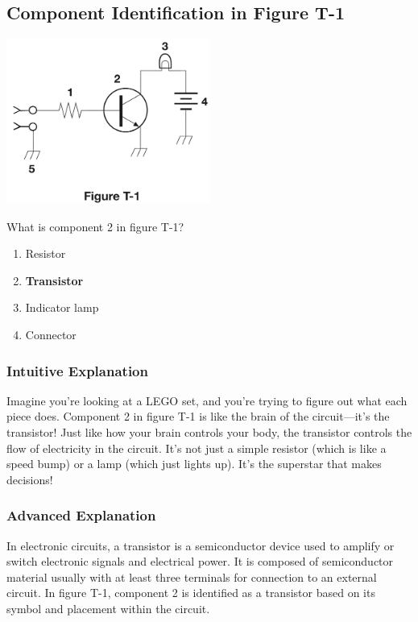 \subsection{Component Identification in Figure T-1}
\label{T6C03}

\begin{tcolorbox}[colback=gray!10!white,colframe=black!75!black,title=T6C03]
    \includegraphics[width=0.5\textwidth]{tech/images/t1.png} 



    What is component 2 in figure T-1?
\begin{enumerate}[label=\Alph*)]
    \item Resistor
    \item \textbf{Transistor}
    \item Indicator lamp
    \item Connector
\end{enumerate}
\end{tcolorbox}

\subsubsection{Intuitive Explanation}
Imagine you’re looking at a LEGO set, and you’re trying to figure out what each piece does. Component 2 in figure T-1 is like the brain of the circuit—it’s the transistor! Just like how your brain controls your body, the transistor controls the flow of electricity in the circuit. It’s not just a simple resistor (which is like a speed bump) or a lamp (which just lights up). It’s the superstar that makes decisions!

\subsubsection{Advanced Explanation}
In electronic circuits, a transistor is a semiconductor device used to amplify or switch electronic signals and electrical power. It is composed of semiconductor material usually with at least three terminals for connection to an external circuit. In figure T-1, component 2 is identified as a transistor based on its symbol and placement within the circuit. 

